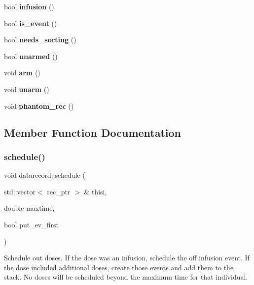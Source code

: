 \begin{DoxyCompactItemize}
bool {\bfseries infusion} ()
\item 
\mbox{\label{classdatarecord_abe9fb68bb832c1f480721076c0e3954e}} 
bool {\bfseries is\+\_\+event} ()
\item 
\mbox{\label{classdatarecord_ab17d439804932ebd46bf091a2762e98c}} 
bool {\bfseries needs\+\_\+sorting} ()
\item 
\mbox{\label{classdatarecord_aa84909506d920ea312809730440720d4}} 
bool {\bfseries unarmed} ()
\item 
\mbox{\label{classdatarecord_a2613ccc7bfb8da426c11fde6a75139c2}} 
void {\bfseries arm} ()
\item 
\mbox{\label{classdatarecord_adba905e12d11b53c0a75eff66e56cd24}} 
void {\bfseries unarm} ()
\item 
\mbox{\label{classdatarecord_ae7e13b74c70e5c4e634dd18127a69da8}} 
void {\bfseries phantom\+\_\+rec} ()
\end{DoxyCompactItemize}


\subsection{Member Function Documentation}
\mbox{\label{classdatarecord_aaf2f67fbf31989c3fa6896126ac24ef9}} 
\subsubsection{\texorpdfstring{schedule()}{schedule()}}
{\footnotesize\ttfamily void datarecord\+::schedule (\begin{DoxyParamCaption}\item[{std\+::vector$<$ rec\+\_\+ptr $>$ \&}]{thisi,  }\item[{double}]{maxtime,  }\item[{bool}]{put\+\_\+ev\+\_\+first }\end{DoxyParamCaption})}

Schedule out doses. If the dose was an infusion, schedule the off infusion event. If the dose included additional doses, create those events and add them to the stack. No doses will be scheduled beyond the maximum time for that individual.


